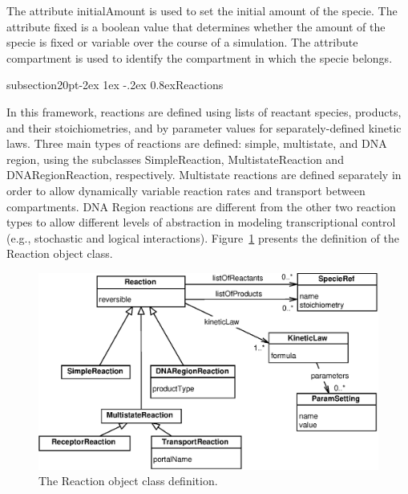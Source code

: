 \documentclass[10pt]{article}
\makeatletter
\renewcommand{\subsection}{\@startsection%
  {subsection}{2}{0pt}{-2ex \@plus 1ex \@minus -.2ex}%
  {0.8ex}{\slshape\large\bfseries}}
\newcommand{\class}[1]{\textsf{#1}}
\newcommand{\attrib}[1]{\textsf{#1}}
\makeatother
\begin{document}
The attribute \attrib{initialAmount} is used to set the initial amount of
the specie.  The attribute \attrib{fixed} is a boolean value that
determines whether the amount of the specie is fixed or variable over the
course of a simulation.  The attribute \attrib{compartment} is used to
identify the compartment in which the specie belongs.


\subsection{Reactions}

In this framework, reactions are defined using lists of reactant species,
products, and their stoichiometries, and by parameter values for
separately-defined kinetic laws.  Three main types of reactions are
defined: simple, multistate, and DNA region, using the subclasses
\class{SimpleReaction}, \class{MultistateReaction} and
\class{DNARegionReaction}, respectively.  Multistate reactions are defined
separately in order to allow dynamically variable reaction rates and
transport between compartments.  DNA Region reactions are different from
the other two reaction types to allow different levels of abstraction in
modeling transcriptional control (e.g., stochastic and logical
interactions).  Figure~\ref{fig:reaction} presents the definition of the
\class{Reaction} object class.

\begin{figure}
  \centering
  \includegraphics[scale = 0.75]{reaction.eps}
  \caption{The \class{Reaction} object class definition.}
  \label{fig:reaction}
\end{figure}
\end{document}
